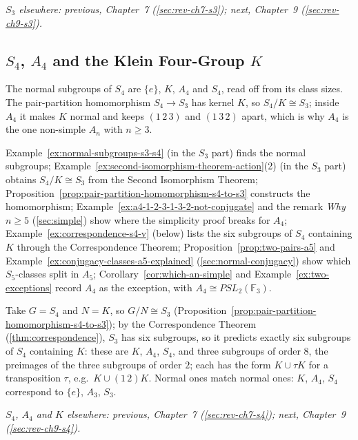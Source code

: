 \documentclass[11pt]{report}
\begin{document}
\textit{$S_3$ elsewhere: previous, Chapter~7 (\ref{sec:rev-ch7-s3}); next, Chapter~9 (\ref{sec:rev-ch9-s3}).}

\subsection{\texorpdfstring{$S_4$, $A_4$ and the Klein Four-Group $K$}{S₄, A₄ and the Klein Four-Group K}}\label{sec:rev-ch8-s4}

The normal subgroups of $S_4$ are $\{e\}$, $K$, $A_4$ and $S_4$, read off from its class sizes. The pair-partition homomorphism $S_4 \to S_3$ has kernel $K$, so $S_4/K \cong S_3$; inside $A_4$ it makes $K$ normal and keeps $(1\,2\,3)$ and $(1\,3\,2)$ apart, which is why $A_4$ is the one non-simple $A_n$ with $n \geq 3$.

Example~\ref{ex:normal-subgroups-s3-s4} (in the $S_3$ part) finds the normal subgroups; Example~\ref{ex:second-isomorphism-theorem-action}(2) (in the $S_3$ part) obtains $S_4/K \cong S_3$ from the Second Isomorphism Theorem; Proposition~\ref{prop:pair-partition-homomorphism-s4-to-s3} constructs the homomorphism; Example~\ref{ex:a4-1-2-3-1-3-2-not-conjugate} and the remark \emph{Why $n \geq 5$} (\ref{sec:simple}) show where the simplicity proof breaks for $A_4$; Example~\ref{ex:correspondence-s4-v} (below) lists the six subgroups of $S_4$ containing $K$ through the Correspondence Theorem; Proposition~\ref{prop:two-pairs-a5} and Example~\ref{ex:conjugacy-classes-a5-explained} (\ref{sec:normal-conjugacy}) show which $S_5$-classes split in $A_5$; Corollary~\ref{cor:which-an-simple} and Example~\ref{ex:two-exceptions} record $A_4$ as the exception, with $A_4 \cong PSL_2(\mathbb{F}_3)$.

\begin{exbox}\label{ex:correspondence-s4-v}
Take $G = S_4$ and $N = K$, so $G/N \cong S_3$ (Proposition~\ref{prop:pair-partition-homomorphism-s4-to-s3}); by the Correspondence Theorem (\ref{thm:correspondence}), $S_3$ has six subgroups, so it predicts exactly six subgroups of $S_4$ containing $K$: these are $K$, $A_4$, $S_4$, and three subgroups of order $8$, the preimages of the three subgroups of order $2$; each has the form $K \cup \tau K$ for a transposition $\tau$, e.g.\ $K \cup (1\,2)K$. Normal ones match normal ones: $K$, $A_4$, $S_4$ correspond to $\{e\}$, $A_3$, $S_3$.
\end{exbox}

\textit{$S_4$, $A_4$ and $K$ elsewhere: previous, Chapter~7 (\ref{sec:rev-ch7-s4}); next, Chapter~9 (\ref{sec:rev-ch9-s4}).}
\end{document}

